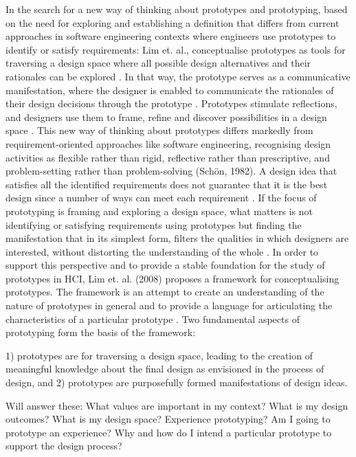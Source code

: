 In the search for a new way of thinking about prototypes and prototyping, based on the need for exploring and establishing a definition that differs from current approaches in software engineering contexts where engineers use prototypes to identify or satisfy requirements: Lim et. al., conceptualise prototypes as tools for traversing a design space where all possible design alternatives and their rationales can be explored \autocite[p. 2]{lim_anatomy_2008}. In that way, the prototype serves as a communicative manifestation, where the designer is enabled to communicate the rationales of their design decisions through the prototype \autocite[p. 2]{lim_anatomy_2008}. Prototypes stimulate reflections, and designers use them to frame, refine and discover possibilities in a design space \autocite[p. 2]{lim_anatomy_2008}. This new way of thinking about prototypes differs markedly from requirement-oriented approaches like software engineering, recognising design activities as flexible rather than rigid, reflective rather than prescriptive, and problem-setting rather than problem-solving (Schön, 1982). A design idea that satisfies all the identified requirements does not guarantee that it is the best design since a number of ways can meet each requirement \autocite[p. 2]{lim_anatomy_2008}. If the focus of prototyping is framing and exploring a design space, what matters is not identifying or satisfying requirements using prototypes but finding the manifestation that in its simplest form, filters the qualities in which designers are interested, without distorting the understanding of the whole \autocite[p. 2]{lim_anatomy_2008}. In order to support this perspective and to provide a stable foundation for the study of prototypes in HCI, Lim et. al. (2008) proposes a framework for conceptualising prototypes. The framework is an attempt to create an understanding of the nature of prototypes in general and to provide a language for articulating the characteristics of a particular prototype \autocite[p. 3]{lim_anatomy_2008}. Two fundamental aspects of prototyping form the basis of the framework:

1) prototypes are for traversing a design space, leading to the creation of meaningful knowledge about the final design as envisioned in the process of design, and
2) prototypes are purposefully formed manifestations of design ideas.
\autocite[p. 3]{lim_anatomy_2008}

Will answer these:
What values are important in my context?
What is my design outcomes?
What is my design space?
Experience prototyping? Am I going to prototype an experience?
Why and how do I intend a particular prototype to support the design process?



